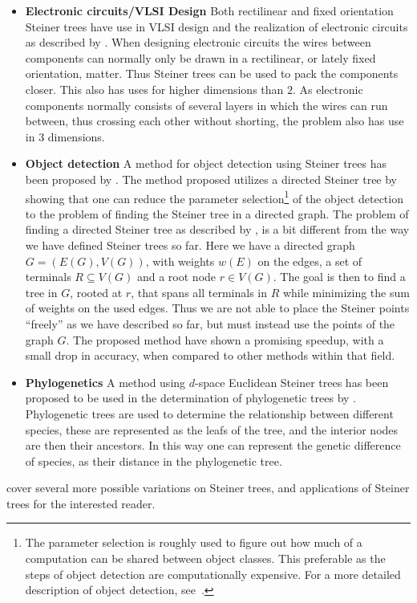 \begin{itemize}
\item \textbf{Electronic circuits/VLSI Design} \quad Both rectilinear and fixed
  orientation Steiner trees have use in VLSI design and the realization of
  electronic circuits as described by
  \textcite[sec.~2.7,sec~3.6]{brazil2015}. When designing electronic circuits
  the wires between components can normally only be drawn in a rectilinear, or
  lately fixed orientation, matter. Thus Steiner trees can be used to pack the
  components closer. This also has uses for higher dimensions than $2$. As
  electronic components normally consists of several layers in which the wires
  can run between, thus crossing each other without shorting, the problem also
  has use in $3$ dimensions.
\item \textbf{Object detection} \quad A method for object detection using
  Steiner trees has been proposed by \textcite{russakovsky2010}. The method
  proposed utilizes a directed Steiner tree by showing that one can reduce the
  parameter selection\footnote{The parameter selection is roughly used to figure
    out how much of a computation can be shared between object classes. This
    preferable as the steps of object detection are computationally
    expensive. For a more detailed description of object detection,
    see~\cite{russakovsky2010}.} of the object detection to the problem of
  finding the Steiner tree in a directed graph. The problem of finding a
  directed Steiner tree as described by \textcite{russakovsky2010}, is a bit
  different from the way we have defined Steiner trees so far. Here we have a
  directed graph $G = (E(G), V(G))$, with weights $w(E)$ on the edges, a set of
  terminals $R \subseteq V(G)$ and a root node $r \in V(G)$. The goal is then to
  find a tree in $G$, rooted at $r$, that spans all terminals in $R$ while
  minimizing the sum of weights on the used edges. Thus we are not able to place
  the Steiner points ``freely'' as we have described so far, but must instead
  use the points of the graph $G$. The proposed method have shown a promising
  speedup, with a small drop in accuracy, when compared to other methods within
  that field.
\item \textbf{Phylogenetics} \quad A method using $d$-space Euclidean Steiner trees
  has been proposed to be used in the determination of phylogenetic trees by
  \textcite{brazil2009}. Phylogenetic trees are used to determine the
  relationship between different species, these are represented as the leafs of
  the tree, and the interior nodes are then their ancestors. In this way one can
  represent the genetic difference of species, as their distance in the
  phylogenetic tree.
\end{itemize}
%
\textcite{brazil2015} cover several more possible variations on Steiner trees,
and applications of Steiner trees for the interested reader.

